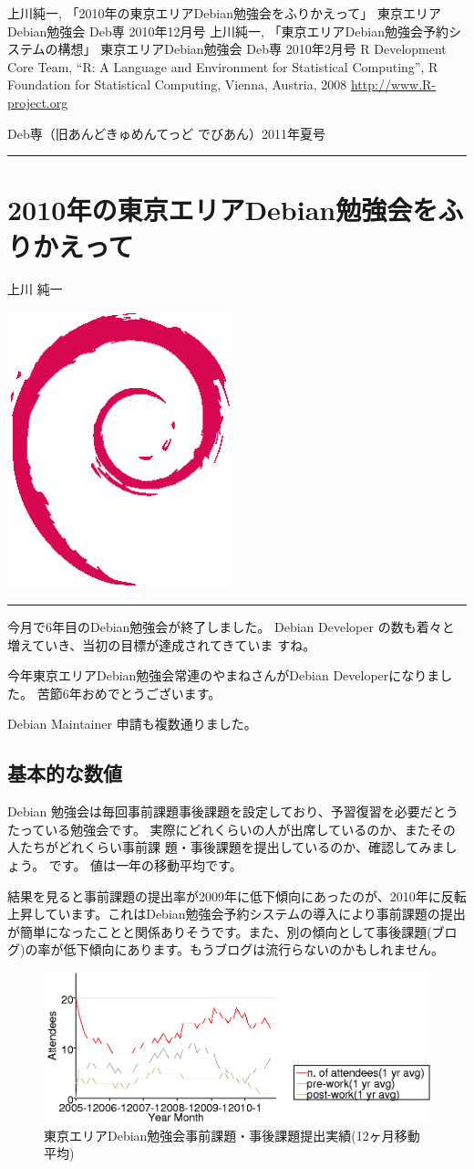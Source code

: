 \documentclass[mingoth,a4paper]{jsarticle}
\renewcommand{\dancersection}[2]{%
\newpage
Deb専（旧あんどきゅめんてっど でびあん）2011年夏号
%
\vspace{0.1mm}\\
{\color{dancerdarkblue}\rule{\hsize}{2mm}}

%
%
\begin{minipage}[t]{0.6\hsize}
\color{dancerdarkblue}
\vspace{1cm}
\section{#1}
\hfill{}#2\\
\end{minipage}
\begin{minipage}[t]{0.4\hsize}
\vspace{-2cm}
\hfill{}\includegraphics[height=8cm]{image200502/openlogo-nd.eps}\\
\vspace{-5cm}
\end{minipage}
%
{\color{dancerlightblue}\rule{0.66\hsize}{2mm}}
%
\vspace{2cm}
}
\begin{document}
\begin{thebibliography}{0}
  上川純一, 「2010年の東京エリアDebian勉強会をふりかえって」
東京エリアDebian勉強会 Deb専 2010年12月号
  上川純一, 「東京エリアDebian勉強会予約システムの構想」
東京エリアDebian勉強会 Deb専 2010年2月号
 R Development Core Team, ``R: A Language and
	Environment for Statistical Computing'', R Foundation for
	Statistical Computing, Vienna, Austria, 2008
	\url{http://www.R-project.org}
\end{thebibliography}

\dancersection{2010年の東京エリアDebian勉強会をふりかえって}{上川 純一}

今月で6年目のDebian勉強会が終了しました。
Debian Developer の数も着々と増えていき、当初の目標が達成されてきていま
すね。

今年東京エリアDebian勉強会常連のやまねさんがDebian Developerになりました。
苦節6年おめでとうございます。

Debian Maintainer 申請も複数通りました。

\subsection{基本的な数値}

Debian 勉強会は毎回事前課題事後課題を設定しており、予習復習を必要だとう
たっている勉強会です。
実際にどれくらいの人が出席しているのか、またその人たちがどれくらい事前課
題・事後課題を提出しているのか、確認してみましょう。
です。
値は一年の移動平均です。

結果を見ると事前課題の提出率が2009年に低下傾向にあったのが、2010年に反転
上昇しています。これはDebian勉強会予約システムの導入により事前課題の提出
が簡単になったことと関係ありそうです。また、別の傾向として事後課題(ブロ
グ)の率が低下傾向にあります。もうブログは流行らないのかもしれません。


\begin{figure}[h]
 \begin{center}
 \includegraphics[width=1\hsize]{image201012/memberanalysis/attend.png}
 \end{center}
\caption{東京エリアDebian勉強会事前課題・事後課題提出実績(12ヶ月移動平均)}\label{fig:attendandprepostwork}
\end{figure}
\end{document}
